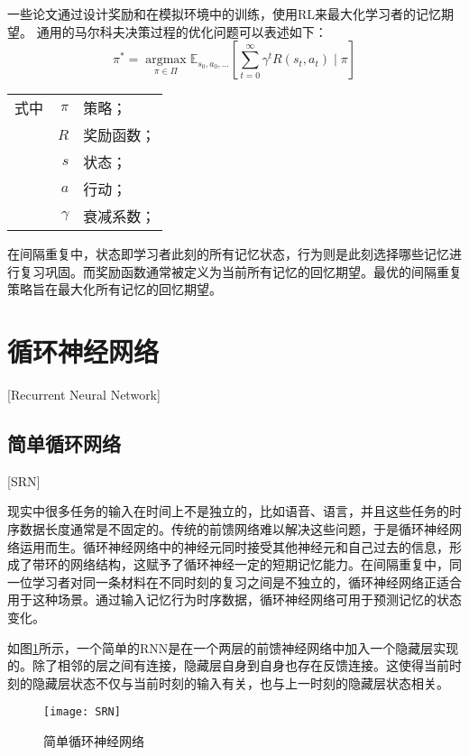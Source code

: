 一些论文\cite{reddyAcceleratingHumanLearning2017,upadhyayDeepReinforcementLearning2018,sinhaUsingDeepReinforcement2019,yangTADSLearningTimeaware2020}通过设计奖励和在模拟环境中的训练，使用RL来最大化学习者的记忆期望。
通用的马尔科夫决策过程的优化问题可以表述如下：
\begin{equation}
    \pi^{*}=\underset{\pi \in \Pi}{\operatorname{argmax}} \mathbb{E}_{s_{0}, a_{0}, \ldots}\left[\sum_{t=0}^{\infty} \gamma^{t} R(s_{t}, a_{t}) \mid \pi\right]
\end{equation}
\begin{tabularx}{\textwidth}{@{}l@{\quad}r@{———}X@{}}
    式中& $\pi$ &策略；\\
    & $R$ &奖励函数；\\
    & $s$ &状态；\\
    & $a$ &行动；\\
    & $\gamma$ &衰减系数；
\end{tabularx}\vspace{3.15bp}

在间隔重复中，状态即学习者此刻的所有记忆状态，行为则是此刻选择哪些记忆进行复习巩固。而奖励函数通常被定义为当前所有记忆的回忆期望。最优的间隔重复策略旨在最大化所有记忆的回忆期望。

\section{循环神经网络}[Recurrent Neural Network]

\subsection{简单循环网络}[SRN]

现实中很多任务的输入在时间上不是独立的，比如语音、语言，并且这些任务的时序数据长度通常是不固定的。传统的前馈网络难以解决这些问题，于是循环神经网络运用而生。循环神经网络中的神经元同时接受其他神经元和自己过去的信息，形成了带环的网络结构，这赋予了循环神经一定的短期记忆能力。在间隔重复中，同一位学习者对同一条材料在不同时刻的复习之间是不独立的，循环神经网络正适合用于这种场景。通过输入记忆行为时序数据，循环神经网络可用于预测记忆的状态变化。

如图\ref{fig:SRN}所示，一个简单的RNN是在一个两层的前馈神经网络中加入一个隐藏层实现的。除了相邻的层之间有连接，隐藏层自身到自身也存在反馈连接。这使得当前时刻的隐藏层状态不仅与当前时刻的输入有关，也与上一时刻的隐藏层状态相关。

\begin{figure}[htbp]
    \centering
    \texttt{[image: SRN]}
    \caption{简单循环神经网络}
    \label{fig:SRN}
\end{figure}

